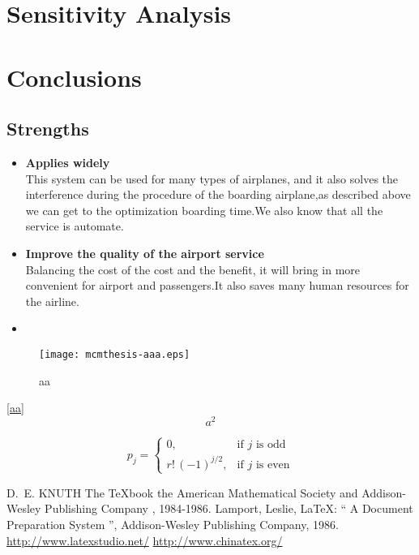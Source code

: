 \documentclass{mcmthesis}
\begin{document}
\section{Sensitivity Analysis}

\section{Conclusions}
\subsection{Strengths}
\begin{itemize}
  \item \textbf{Applies widely}\\
        This  system can be used for many types of airplanes, and it also
        solves the interference during  the procedure of the boarding
        airplane,as described above we can get to the  optimization
        boarding time.We also know that all the service is automate.
  \item \textbf{Improve the quality of the airport service}\\
        Balancing the cost of the cost and the benefit, it will bring in
        more convenient  for airport and passengers.It also saves many
        human resources for the airline. \item \textbf{}
\end{itemize}

\begin{figure}[h]
  \small
  \centering
  \texttt{[image: mcmthesis-aaa.eps]}
  \caption{aa} \label{fig:aa}
\end{figure}

\lipsum[8] \eqref{aa}
\begin{equation}
  a^2 \label{aa}
\end{equation}


\[
  p_{j}=\begin{cases} 0,              & \text{if $j$ is odd}  \\
    r!\,(-1)^{j/2}, & \text{if $j$ is even}
  \end{cases}
\]

\begin{thebibliography}{99}
   D.~E. KNUTH   The \TeX{}book  the American
  Mathematical Society and Addison-Wesley
  Publishing Company , 1984-1986.
  Lamport, Leslie,  \LaTeX{}: `` A Document Preparation System '',
  Addison-Wesley Publishing Company, 1986.
  \url{http://www.latexstudio.net/}
  \url{http://www.chinatex.org/}
\end{thebibliography}
\end{document}
